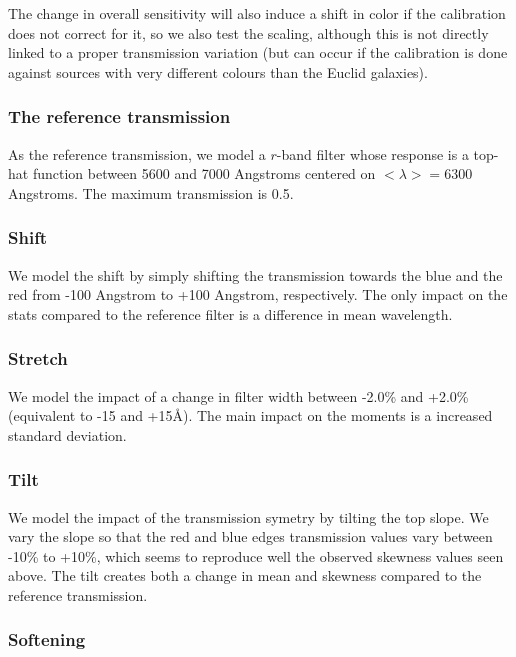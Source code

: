 \documentclass[11pt]{article}
\begin{document}
The change in overall sensitivity will also induce a shift in color if
the calibration does not correct for it, so we also test the scaling,
although this is not directly linked to a proper transmission variation
(but can occur if the calibration is done against sources with very
different colours than the Euclid galaxies).

\subsubsection{The reference
transmission}\label{the-reference-transmission}

As the reference transmission, we model a \(r\)-band filter whose
response is a top-hat function between 5600 and 7000 Angstroms centered
on \(<\lambda>=6300\) Angstroms. The maximum transmission is 0.5.

\subsubsection{Shift}\label{shift}

We model the shift by simply shifting the transmission towards the blue
and the red from -100 Angstrom to +100 Angstrom, respectively. The only
impact on the stats compared to the reference filter is a difference in
mean wavelength.

\subsubsection{Stretch}\label{stretch}

We model the impact of a change in filter width between -2.0\% and
+2.0\% (equivalent to -15 and +15\AA). The main impact on the moments is
a increased standard deviation.

\subsubsection{Tilt}\label{tilt}

We model the impact of the transmission symetry by tilting the top
slope. We vary the slope so that the red and blue edges transmission
values vary between -10\% to +10\%, which seems to reproduce well the
observed skewness values seen above. The tilt creates both a change in
mean and skewness compared to the reference transmission.

\subsubsection{Softening}\label{softening}
\end{document}
